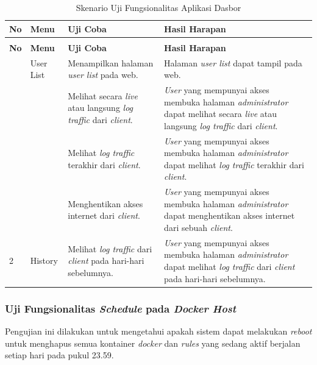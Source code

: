 \begin{longtable}{|p{}|p{}|p{}|p{}|}
	\caption{Skenario Uji Fungsionalitas Aplikasi Halaman \textit{Administrator}} \label{ujicoba5} \\
	\hline
	\textbf{No} & \textbf{Menu} & \textbf{Uji Coba} & \textbf{Hasil Harapan} \\ \hline
	\endfirsthead
	\caption[]{Skenario Uji Fungsionalitas Aplikasi Dasbor}  \\
	\hline
	\textbf{No} & \textbf{Menu} & \textbf{Uji Coba} & \textbf{Hasil Harapan} \\ \hline
	\endhead
	\endfoot
	\endlastfoot
	1 & User List & Menampilkan halaman \textit{user list} pada web. & Halaman \textit{user list} dapat tampil pada web. \\ \cline{3-4}
	&& Melihat secara \textit{live} atau langsung \textit{log traffic} dari \textit{client}. & \textit{User} yang mempunyai akses membuka halaman \textit{administrator} dapat melihat secara \textit{live} atau langsung \textit{log traffic} dari \textit{client}. \\ \cline{3-4}
	&& Melihat \textit{log traffic} terakhir dari \textit{client}. & \textit{User} yang mempunyai akses membuka halaman \textit{administrator} dapat melihat \textit{log traffic} terakhir dari \textit{client}. \\ \hline
	&& Menghentikan akses internet dari \textit{client}. & \textit{User} yang mempunyai akses membuka halaman \textit{administrator} dapat menghentikan akses internet dari sebuah \textit{client}. \\ \hline
	2 & History & Melihat \textit{log traffic} dari \textit{client} pada hari-hari sebelumnya.  & \textit{User} yang mempunyai akses membuka halaman \textit{administrator} dapat melihat \textit{log traffic} dari \textit{client} pada hari-hari sebelumnya. \\ \hline
\end{longtable}

\subsubsection{Uji Fungsionalitas \textit{Schedule} pada \textit{Docker Host}} \label{keenam}
Pengujian ini dilakukan untuk mengetahui apakah sistem dapat melakukan \textit{reboot} untuk menghapus semua kontainer \textit{docker} dan \textit{rules} yang sedang aktif berjalan setiap hari pada pukul 23.59.

